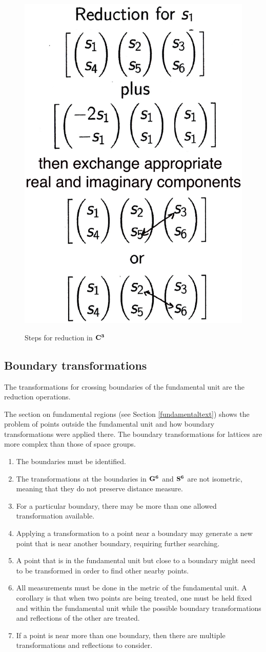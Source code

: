 \documentclass[preprint]{iucr}              %
\numberwithin{equation}{section}
\newcommand{\SVI}[0]{$\bf{S^{6}}$}
\newcommand{\GVI}[0]{$\bf{G^{6}}$}
\newcommand{\CIII}[0]{$\bf{C^{3}}$}
\begin{document}
\begin{figure}
	\includegraphics[height=0.65\textwidth]{S6_ops_C}
	\label{S6_ops_B}
	\caption{Steps for reduction in \CIII{}}
\end{figure}


	
	\subsection{Boundary transformations}
	
	The transformations for crossing boundaries of the 
	fundamental unit are the reduction operations.
	
		The section on fundamental regions (see Section \ref{fundamentaltext}) shows the problem of points outside
	the fundamental unit and how boundary transformations were applied
	there. The boundary transformations for lattices are more complex
	than those of space groups. 
	
\begin{enumerate}
	\item  The boundaries must be identified.
	\item  The transformations at the boundaries in \GVI{} and
	 	\SVI{} are not isometric, meaning that they do not preserve
	 	distance measure.
	\item  For a particular boundary, there may be more than one
	 	allowed transformation available.
	\item  Applying a transformation to a point near a boundary may generate
	 	a new point that is near another boundary, requiring further
	 	searching.
	 \item A point that is in the fundamental unit but
	 close to a boundary might need to be transformed in order to
	 find other nearby points.
	 \item All measurements must be done in the metric of the
	 fundamental unit. A corollary is that when two points are
	 being treated, one must be held fixed and within the 
	 fundamental unit while the possible boundary transformations 
	 and reflections of the other are treated.
	 \item If a point is near more than one boundary,
	 then there are multiple transformations and reflections
	  to consider.
\end{enumerate}	
\end{document}
